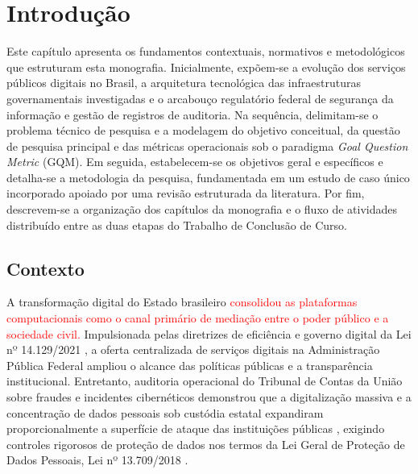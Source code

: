 \chapter{Introdução}
\label{cap:introducao}

Este capítulo apresenta os fundamentos contextuais, normativos e metodológicos que estruturam esta monografia. Inicialmente, expõem-se a evolução dos serviços públicos digitais no Brasil, a arquitetura tecnológica das infraestruturas governamentais investigadas e o arcabouço regulatório federal de segurança da informação e gestão de registros de auditoria. Na sequência, delimitam-se o problema técnico de pesquisa e a modelagem do objetivo conceitual, da questão de pesquisa principal e das métricas operacionais sob o paradigma \textit{Goal Question Metric} (GQM). Em seguida, estabelecem-se os objetivos geral e específicos e detalha-se a metodologia da pesquisa, fundamentada em um estudo de caso único incorporado apoiado por uma revisão estruturada da literatura. Por fim, descrevem-se a organização dos capítulos da monografia e o fluxo de atividades distribuído entre as duas etapas do Trabalho de Conclusão de Curso.

\section{Contexto}
\label{sec:intro_contexto}


A transformação digital do Estado brasileiro \textcolor{red}{consolidou as plataformas computacionais como o canal primário de mediação entre o poder público e a sociedade civil.}  
 Impulsionada pelas diretrizes de eficiência e governo digital da Lei nº 14.129/2021 \cite{lei14129_2021}, a oferta centralizada de serviços digitais na Administração Pública Federal ampliou o alcance das políticas públicas e a transparência institucional. Entretanto, auditoria operacional do Tribunal de Contas da União sobre fraudes e incidentes cibernéticos demonstrou que a digitalização massiva e a concentração de dados pessoais sob custódia estatal expandiram proporcionalmente a superfície de ataque das instituições públicas \cite{tcu_golpes2025}, exigindo controles rigorosos de proteção de dados nos termos da Lei Geral de Proteção de Dados Pessoais, Lei nº 13.709/2018 \cite{lgpd2018}.

